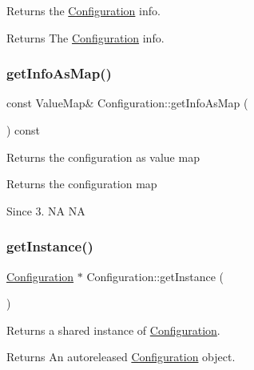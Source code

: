 Returns the \hyperlink{classConfiguration}{Configuration} info.

\begin{DoxyReturn}{Returns}
The \hyperlink{classConfiguration}{Configuration} info. 
\end{DoxyReturn}
\mbox{\label{classConfiguration_a4f2eb957b2b5fffc55c87eb30ab7740c}} 
\subsubsection{\texorpdfstring{get\+Info\+As\+Map()}{getInfoAsMap()}}
{\footnotesize\ttfamily const Value\+Map\& Configuration\+::get\+Info\+As\+Map (\begin{DoxyParamCaption}{ }\end{DoxyParamCaption}) const\hspace{0.3cm}{\ttfamily [inline]}}

Returns the configuration as value map \begin{DoxyReturn}{Returns}
the configuration map 
\end{DoxyReturn}
\begin{DoxySince}{Since}
3.  NA  NA 
\end{DoxySince}
\mbox{\label{classConfiguration_ae327d26e81014cf46b25802478fe9b8e}} 
\subsubsection{\texorpdfstring{get\+Instance()}{getInstance()}\hspace{0.1cm}{\footnotesize\ttfamily [1/2]}}
{\footnotesize\ttfamily \hyperlink{classConfiguration}{Configuration} $\ast$ Configuration\+::get\+Instance (\begin{DoxyParamCaption}{ }\end{DoxyParamCaption})\hspace{0.3cm}{\ttfamily [static]}}

Returns a shared instance of \hyperlink{classConfiguration}{Configuration}.

\begin{DoxyReturn}{Returns}
An autoreleased \hyperlink{classConfiguration}{Configuration} object. 
\end{DoxyReturn}
\mbox{\label{classConfiguration_a2a17128e80c832648bdf255be27eca13}} 

